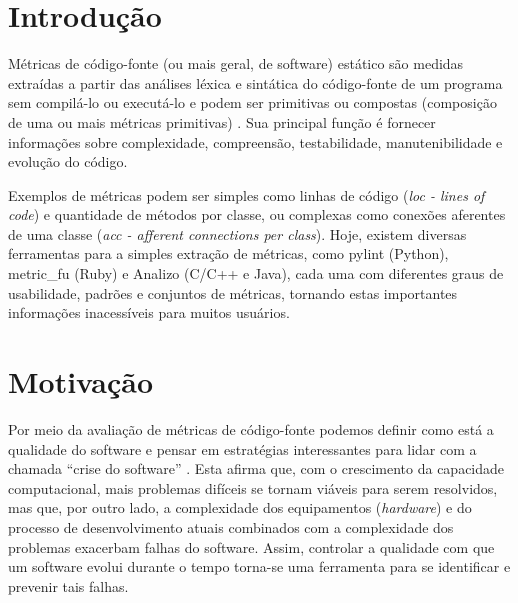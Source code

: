\documentclass[10pt]{article}
\begin{document}
\newpage

\section{Introdução} \label{sec:intro}
Métricas de código-fonte (ou mais geral, de software) estático são medidas extraídas a partir das análises léxica e sintática do código-fonte de um programa sem compilá-lo ou executá-lo e podem ser primitivas ou compostas (composição de uma ou mais métricas primitivas) \cite{m13}. Sua principal função é fornecer informações sobre complexidade, compreensão, testabilidade, manutenibilidade e evolução do código\cite{m13}.

Exemplos de métricas podem ser simples como linhas de código (\textit{loc - lines of code}) e quantidade de métodos por classe, ou complexas como conexões aferentes de uma classe (\textit{acc - afferent connections per class}).
Hoje, existem diversas ferramentas para a simples extração de métricas, como pylint (Python), metric\_fu (Ruby) e Analizo (C/C++ e Java), cada uma com diferentes graus de usabilidade, padrões e conjuntos de métricas, tornando estas importantes informações inacessíveis para muitos usuários.

\section{Motivação}
Por meio da avaliação de métricas de código-fonte podemos definir como está a qualidade do software e pensar em estratégias interessantes para lidar com a chamada ``crise do software'' \cite{nr68}. Esta afirma que, com o crescimento da capacidade computacional, mais problemas difíceis se tornam viáveis para serem resolvidos, mas que, por outro lado, a complexidade dos equipamentos (\textit{hardware}) e do processo de desenvolvimento atuais combinados com a complexidade dos problemas exacerbam falhas do software. Assim, controlar a qualidade com que um software evolui durante o tempo torna-se uma ferramenta para se identificar e prevenir tais falhas.
\end{document}
